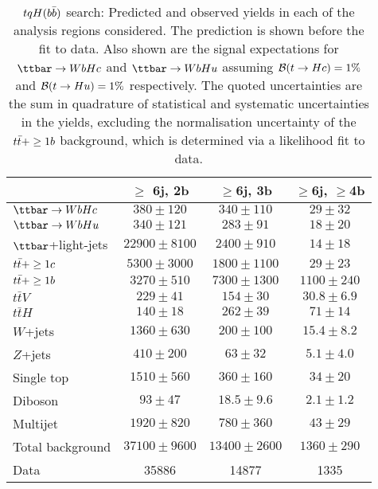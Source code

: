 \begin{table}[htbp]
\begin{center}
\begin{tabular}{l*{3}{c}}
\hline\hline
 & $\geq$ 6j, 2b & $\geq$6j, 3b & $\geq$6j, $\geq$4b \\
\hline
$\Hc$ & $ 380 \pm 120 $ &   $ 340 \pm 110 $ &   $ 29 \pm 32 $ \\ 
$\Hu$ & $ 340 \pm 121 $ &   $ 283 \pm 91 $ &   $ 18 \pm 20 $ \\ 
\hline
$\ttbar$+light-jets  &   $ 22900 \pm 8100 $ &   $ 2400 \pm 910 $ &   $ 14 \pm 18 $ \\ 
$t\bar{t}+\geq1c$  &   $ 5300 \pm 3000 $ &   $ 1800 \pm 1100 $ &   $ 29 \pm 23 $ \\ 
$t\bar{t}+\geq1b$  &   $ 3270 \pm 510 $ &   $ 7300 \pm 1300 $ &   $ 1100 \pm 240 $ \\ 
$t\bar{t}V$  &   $ 229 \pm 41 $ &   $ 154 \pm 30 $ &   $ 30.8 \pm 6.9 $ \\ 
$t\bar{t}H$  &   $ 140 \pm 18 $ &   $ 262 \pm 39 $ &   $ 71 \pm 14 $ \\ 
$W$+jets  &   $ 1360 \pm 630 $ &   $ 200 \pm 100 $ &   $ 15.4 \pm 8.2 $ \\ 
$Z$+jets  &   $ 410 \pm 200 $ &   $ 63 \pm 32 $ &   $ 5.1 \pm 4.0 $ \\ 
Single top  &   $ 1510 \pm 560 $ &   $ 360 \pm 160 $ &   $ 34 \pm 20 $ \\ 
Diboson  &   $ 93 \pm 47 $ &   $ 18.5 \pm 9.6 $ &   $ 2.1 \pm 1.2 $ \\ 
Multijet  &   $ 1920 \pm 820 $ &   $ 780 \pm 360 $ &   $ 43 \pm 29 $ \\ 
\hline
Total background &  $ 37100 \pm 9600 $ &   $ 13400 \pm 2600 $ &   $ 1360 \pm 290 $ \\ 
\hline
Data & 35886  & 14877  & 1335  \\ 
\hline\hline    
\end{tabular}

%
\end{center}
\caption{
$tqH(b\bar{b})$ search: Predicted and observed yields in each of the analysis regions considered.
The prediction is shown before the fit to data. Also shown are the signal expectations for 
$\Hc$ and $\Hu$ assuming $\mathcal{B}(t\to Hc)=1\%$ and $\mathcal{B}(t\to Hu)=1\%$ respectively.
The quoted uncertainties are the sum in quadrature of statistical and systematic uncertainties in the yields, 
excluding the normalisation uncertainty of the $t\bar{t}+\geq1b$ background, which is determined via a likelihood fit to data.
}
\label{tab:Hbb_Prefit_Yields_Unblind}
\end{table} 

